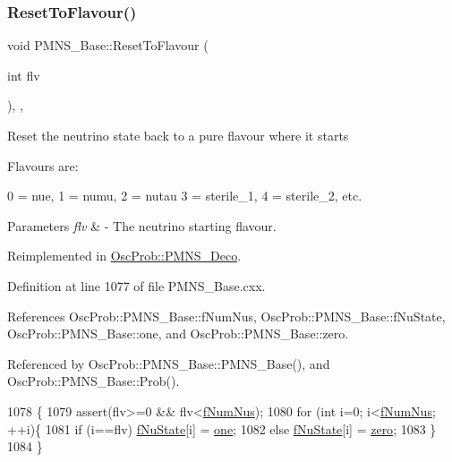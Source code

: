 \subsubsection{\texorpdfstring{Reset\+To\+Flavour()}{ResetToFlavour()}}
{\footnotesize\ttfamily void P\+M\+N\+S\+\_\+\+Base\+::\+Reset\+To\+Flavour (\begin{DoxyParamCaption}\item[{int}]{flv }\end{DoxyParamCaption})\hspace{0.3cm}{\ttfamily [protected]}, {\ttfamily [virtual]}, {\ttfamily [inherited]}}

Reset the neutrino state back to a pure flavour where it starts

Flavours are\+: 
\begin{DoxyPre}
  0 = nue, 1 = numu, 2 = nutau
  3 = sterile\_1, 4 = sterile\_2, etc.
\end{DoxyPre}
 
\begin{DoxyParams}{Parameters}
{\em flv} & -\/ The neutrino starting flavour. \\
\hline
\end{DoxyParams}


Reimplemented in \hyperlink{classOscProb_1_1PMNS__Deco_a393940f176614e3ffebeea40cfe78a62}{Osc\+Prob\+::\+P\+M\+N\+S\+\_\+\+Deco}.



Definition at line 1077 of file P\+M\+N\+S\+\_\+\+Base.\+cxx.



References Osc\+Prob\+::\+P\+M\+N\+S\+\_\+\+Base\+::f\+Num\+Nus, Osc\+Prob\+::\+P\+M\+N\+S\+\_\+\+Base\+::f\+Nu\+State, Osc\+Prob\+::\+P\+M\+N\+S\+\_\+\+Base\+::one, and Osc\+Prob\+::\+P\+M\+N\+S\+\_\+\+Base\+::zero.



Referenced by Osc\+Prob\+::\+P\+M\+N\+S\+\_\+\+Base\+::\+P\+M\+N\+S\+\_\+\+Base(), and Osc\+Prob\+::\+P\+M\+N\+S\+\_\+\+Base\+::\+Prob().


\begin{DoxyCode}
1078 \{
1079   assert(flv>=0 && flv<\hyperlink{classOscProb_1_1PMNS__Base_a24bb74bed63569dfe88b18fa6a08060e}{fNumNus});
1080   \textcolor{keywordflow}{for} (\textcolor{keywordtype}{int} i=0; i<\hyperlink{classOscProb_1_1PMNS__Base_a24bb74bed63569dfe88b18fa6a08060e}{fNumNus}; ++i)\{
1081     \textcolor{keywordflow}{if} (i==flv) \hyperlink{classOscProb_1_1PMNS__Base_abf99f2339e3ee989600740b5d88063e8}{fNuState}[i] = \hyperlink{classOscProb_1_1PMNS__Base_a7d1d0bbcab30a1fd8c368c40134c51ff}{one};
1082     \textcolor{keywordflow}{else}        \hyperlink{classOscProb_1_1PMNS__Base_abf99f2339e3ee989600740b5d88063e8}{fNuState}[i] = \hyperlink{classOscProb_1_1PMNS__Base_a05e595848c2521dc795efa7645728b94}{zero};
1083   \}
1084 \}
\end{DoxyCode}
\mbox{\label{classOscProb_1_1PMNS__Base_aae18afd69074211335f49ec40e6011b9}} 
